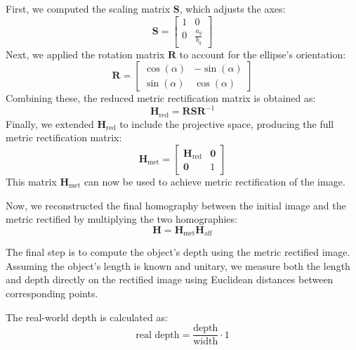 \documentclass{Academic}
\begin{document}
First, we computed the scaling matrix $\mathbf{S}$, which adjusts the axes:
\begin{equation}
    \mathbf{S} = \begin{bmatrix}
        1 & 0 \\ 0 & \frac{a_q}{b_q}
    \end{bmatrix}
\end{equation}
Next, we applied the rotation matrix $\mathbf{R}$ to account for the ellipse's orientation:
\begin{equation}
    \mathbf{R}=\begin{bmatrix}
        \cos(\alpha) & -\sin(\alpha) \\ \sin(\alpha) & \cos(\alpha)
    \end{bmatrix}
\end{equation} 
Combining these, the reduced metric rectification matrix is obtained as:
\begin{equation}
    \mathbf{H}_{\text{red}}= \mathbf{RSR}^{-1}
\end{equation}
Finally, we extended $\mathbf{H}_{\text{red}}$ to include the projective space, producing the full metric rectification matrix:
\begin{equation}
    \mathbf{H}_{\text{met}}=\begin{bmatrix}
        \mathbf{H}_{\text{red}} & \mathbf{0} \\
        \mathbf{0} & 1
    \end{bmatrix}
\end{equation}
This matrix $\mathbf{H}_{\text{met}}$ can now be used to achieve metric rectification of the image.

Now, we reconstructed the final homography between the initial image and the metric rectified by multiplying the two homographies: 
\begin{equation}
    \mathbf{H} = \mathbf{H}_{\text{met}} \mathbf{H}_{\text{aff}}
\end{equation}

The final step is to compute the object's depth using the metric rectified image. 
Assuming the object's length is known and unitary, we measure both the length and depth directly on the rectified image using Euclidean distances between corresponding points. 

\noindent The real-world depth is calculated as:
\begin{equation}\text{real depth}=\dfrac{\text{depth}}{\text{width}} \cdot 1\end{equation}
\end{document}
